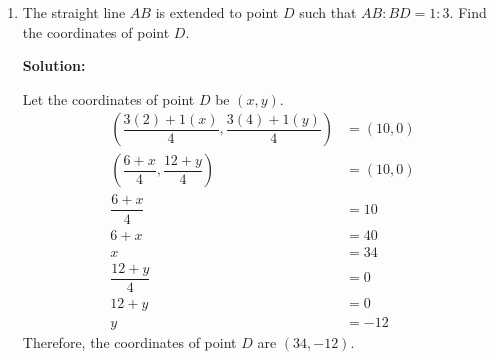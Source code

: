 \documentclass{report}
\newcommand{\sol}{\textbf{Solution:}}
\begin{document}
\begin{enumerate}[leftmargin=*]
\begin{enumerate}
\begin{enumerate}
                              $\therefore$ the gradient of $AB$ is $-\dfrac{1}{2}$.
                              \begin{align*}
                                  y - 4  & = -\frac{1}{2}(x-2) \\
                                  2y - 8 & = -x+2              \\
                                  x + 2y & = 10
                              \end{align*}

                        \item the coordinates of point $B$.

                              \sol{}

                              Point $B$ is touching the $x$-axis. Therefore, the $y$-coordinate of point $B$
                              is 0.

                              When $y=0$,
                              \begin{align*}
                                  0 & = 2x - 20 \\
                                  x & = 10
                              \end{align*}
                              Therefore, the coordinates of point $B$ are $(10,0)$.
                    \end{enumerate}

              \item The straight line $A B$ is extended to point $D$ such that $A B: B D=1: 3$.
                    Find the coordinates of point $D$.

                    \sol{}

                    Let the coordinates of point $D$ be $(x, y)$.
                    \begin{align*}
                        \left(\dfrac{3(2) + 1(x)}{4}, \dfrac{3(4) + 1(y)}{4}\right) & = (10,0) \\
                        \left(\dfrac{6 + x}{4}, \dfrac{12 + y}{4}\right)            & = (10,0) \\
                        \dfrac{6 + x}{4}                                            & = 10     \\
                        6 + x                                                       & = 40     \\
                        x                                                           & = 34     \\
                        \dfrac{12 + y}{4}                                           & = 0      \\
                        12 + y                                                      & = 0      \\
                        y                                                           & = -12
                    \end{align*}
                    Therefore, the coordinates of point $D$ are $(34,-12)$.


\end{enumerate}
\end{enumerate}
\end{document}
